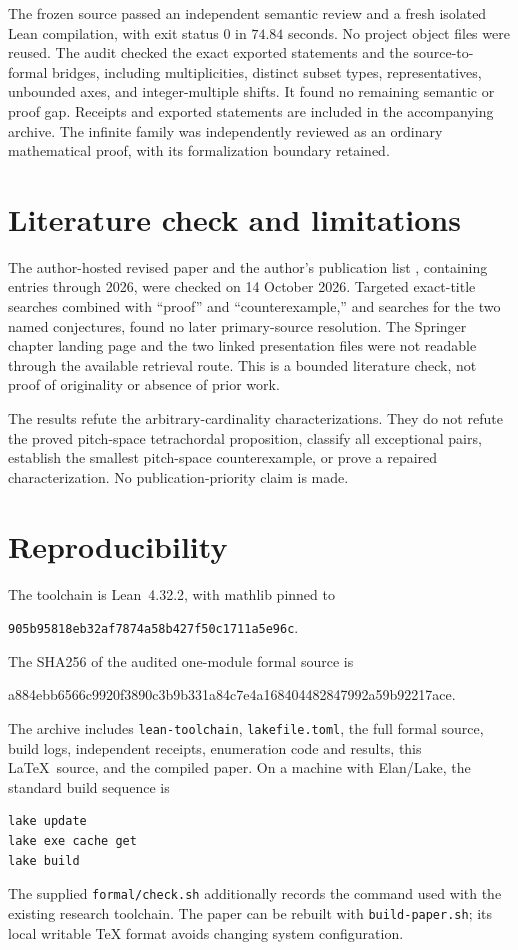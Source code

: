 \documentclass[10pt]{article}
\theoremstyle{remark}
\begin{document}
The frozen source passed an independent semantic review and a fresh isolated
Lean compilation, with exit status $0$ in $74.84$ seconds. No project object
files were reused. The audit checked the exact exported statements and the
source-to-formal bridges, including multiplicities, distinct subset types,
representatives, unbounded axes, and integer-multiple shifts. It found no
remaining semantic or proof gap. Receipts and exported statements are
included in the accompanying archive. The infinite family was independently
reviewed as an ordinary mathematical proof, with its formalization boundary
retained.

\section{Literature check and limitations}
The author-hosted revised paper and the author's publication list
\cite{Yust,YustList}, containing entries through 2026, were checked on
14 October 2026. Targeted exact-title searches combined with ``proof'' and
``counterexample,'' and searches for the two named conjectures, found no
later primary-source resolution. The Springer chapter landing page and the
two linked presentation files were not readable through the available
retrieval route. This is a bounded literature check, not proof of originality
or absence of prior work.

The results refute the arbitrary-cardinality characterizations. They do not
refute the proved pitch-space tetrachordal proposition, classify all
exceptional pairs, establish the smallest pitch-space counterexample, or
prove a repaired characterization. No publication-priority claim is made.

\appendix
\section{Reproducibility}
The toolchain is Lean~4.32.2, with mathlib pinned to
\begin{center}
\texttt{905b95818eb32af7874a58b427f50c1711a5e96c}.
\end{center}
The SHA256 of the audited one-module formal source is
\begin{center}\small\ttfamily
a884ebb6566c9920f3890c3b9b331a84c7e4a168404482847992a59b92217ace.
\end{center}
The archive includes \texttt{lean-toolchain}, \texttt{lakefile.toml}, the full
formal source, build logs, independent receipts, enumeration code and results,
this \LaTeX\ source, and the compiled paper. On a machine with Elan/Lake,
the standard build sequence is
\begin{verbatim}
lake update
lake exe cache get
lake build
\end{verbatim}
The supplied \texttt{formal/check.sh} additionally records the command used
with the existing research toolchain. The paper can be rebuilt with
\texttt{build-paper.sh}; its local writable TeX format avoids changing system
configuration.
\end{document}
